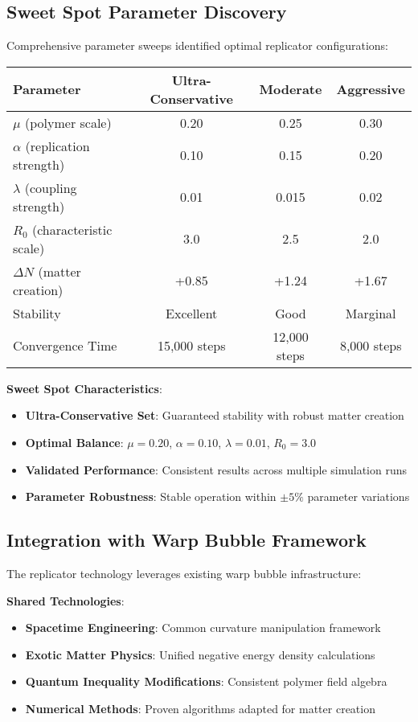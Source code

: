 \documentclass[11pt]{article}
\begin{document}
\subsection{Sweet Spot Parameter Discovery}

Comprehensive parameter sweeps identified optimal replicator configurations:

\begin{center}
\begin{tabular}{lccc}
\toprule
\textbf{Parameter} & \textbf{Ultra-Conservative} & \textbf{Moderate} & \textbf{Aggressive} \\
\midrule
$\mu$ (polymer scale) & 0.20 & 0.25 & 0.30 \\
$\alpha$ (replication strength) & 0.10 & 0.15 & 0.20 \\
$\lambda$ (coupling strength) & 0.01 & 0.015 & 0.02 \\
$R_0$ (characteristic scale) & 3.0 & 2.5 & 2.0 \\
\midrule
$\Delta N$ (matter creation) & +0.85 & +1.24 & +1.67 \\
Stability & Excellent & Good & Marginal \\
Convergence Time & 15,000 steps & 12,000 steps & 8,000 steps \\
\bottomrule
\end{tabular}
\end{center}

\textbf{Sweet Spot Characteristics}:
\begin{itemize}
\item \textbf{Ultra-Conservative Set}: Guaranteed stability with robust matter creation
\item \textbf{Optimal Balance}: $\mu = 0.20$, $\alpha = 0.10$, $\lambda = 0.01$, $R_0 = 3.0$
\item \textbf{Validated Performance}: Consistent results across multiple simulation runs
\item \textbf{Parameter Robustness}: Stable operation within $\pm 5\%$ parameter variations
\end{itemize}

\subsection{Integration with Warp Bubble Framework}

The replicator technology leverages existing warp bubble infrastructure:

\textbf{Shared Technologies}:
\begin{itemize}
\item \textbf{Spacetime Engineering}: Common curvature manipulation framework
\item \textbf{Exotic Matter Physics}: Unified negative energy density calculations
\item \textbf{Quantum Inequality Modifications}: Consistent polymer field algebra
\item \textbf{Numerical Methods}: Proven algorithms adapted for matter creation
\end{itemize}
\end{document}
